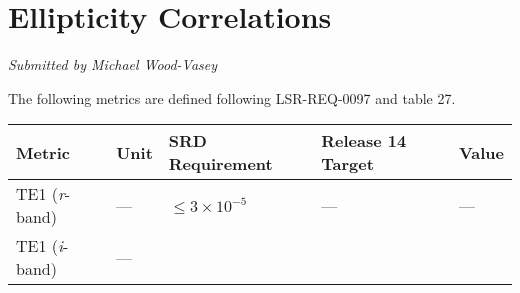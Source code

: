 \documentclass[DM,toc]{lsstdoc}
\begin{document}
\section{Ellipticity Correlations}\label{ellipticity-correlations}

\emph{Submitted by Michael Wood-Vasey}

The following metrics are defined following LSR-REQ-0097
 and  table 27.

\begin{longtable}[]{@{}lllll@{}}
\toprule
\begin{minipage}[b]{0.13\columnwidth}\raggedright\strut
Metric\strut
\end{minipage} & \begin{minipage}[b]{0.05\columnwidth}\raggedright\strut
Unit\strut
\end{minipage} & \begin{minipage}[b]{0.24\columnwidth}\raggedright\strut
SRD Requirement\strut
\end{minipage} & \begin{minipage}[b]{0.21\columnwidth}\raggedright\strut
Release 14 Target\strut
\end{minipage} & \begin{minipage}[b]{0.22\columnwidth}\raggedright\strut
Value\strut
\end{minipage}\tabularnewline
\midrule
\endhead
\begin{minipage}[t]{0.13\columnwidth}\raggedright\strut
TE1 (\emph{r}-band)\strut
\end{minipage} & \begin{minipage}[t]{0.05\columnwidth}\raggedright\strut
---\strut
\end{minipage} & \begin{minipage}[t]{0.24\columnwidth}\raggedright\strut
\(\leq 3\times 10^{-5}\)\strut
\end{minipage} & \begin{minipage}[t]{0.21\columnwidth}\raggedright\strut
---\strut
\end{minipage} & \begin{minipage}[t]{0.22\columnwidth}\raggedright\strut
---\strut
\end{minipage}\tabularnewline
\begin{minipage}[t]{0.13\columnwidth}\raggedright\strut
TE1 (\emph{i}-band)\strut
\end{minipage} & \begin{minipage}[t]{0.05\columnwidth}\raggedright\strut
---\strut

\end{minipage}
\end{longtable}
\end{document}
